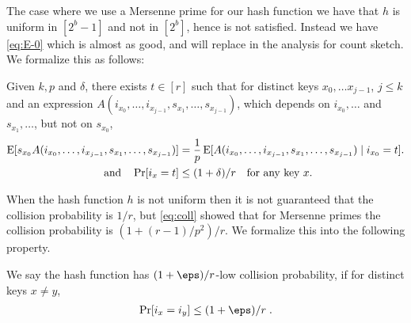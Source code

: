 The case where we use a Mersenne prime for our hash function we have that $h$ is uniform in $[2^b - 1]$ and not in $[2^b]$, hence  is not satisfied.
Instead we have \cref{eq:E-0} which is almost as good, and will replace  in the analysis for count sketch.
We formalize this as follows:
\begin{property}\label{prop:near-independence}
    Given $k, p$ and $\delta$,
    there exists $t \in [r]$ such that for distinct keys $x_0, \ldots x_{j - 1}$, $j \le k$
    and an expression $A(i_{x_0}, \ldots, i_{x_{j - 1}}, s_{x_1}, \dots, s_{x_{j - 1}})$,
    which depends on $i_{x_0}, \ldots$
    and $s_{x_1}, \ldots$,
    but not on $s_{x_0}$,
    \begin{align}
        \operatorname*{E}[s_{x_0} A(i_{x_0}, \ldots, i_{x_{j - 1}}, s_{x_1}, \ldots, s_{x_{j - 1}})]
            &= \frac1p \operatorname*{E}[A(i_{x_0}, \ldots, i_{x_{j - 1}}, s_{x_1}, \ldots, s_{x_{j - 1}}) \mid i_{x_0} = t].
         \label{eq:near-independence}
            \\
            \text{and}\quad
    \Pr[i_x = t] &\le (1 + \delta)/r
    \quad\text{for any key $x$}.
         \label{eq:prob-special-value}
    \end{align}
\end{property}

When the hash function $h$ is not uniform then it is not guaranteed that
the collision probability is $1/r$, but \eqref{eq:coll} showed that for
Mersenne primes the collision probability is $(1 + (r - 1)/p^2)/r$.
We formalize this into the following property.
\begin{property}\label{prop:collision}
   We say the hash function has $(1+\eps)/r$-low collision probability, if
    for distinct keys $x \neq y$,
    \begin{align}\label{eq:collision}
        \Pr[i_x = i_y] \le (1 + \eps)/r\; .
    \end{align}
\end{property}

